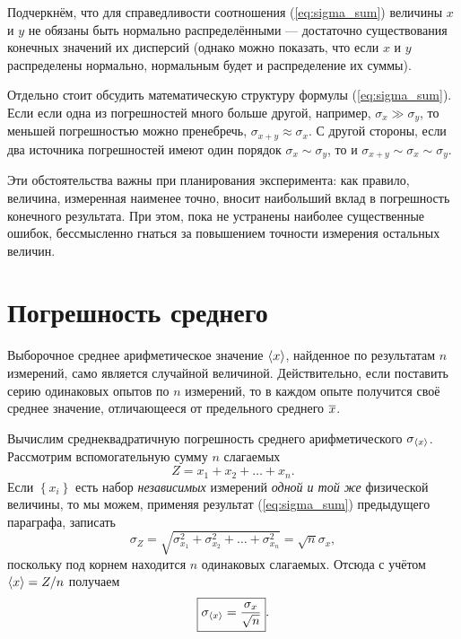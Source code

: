 Подчеркнём, что для справедливости соотношения (\ref{eq:sigma_sum})
величины $x$ и $y$ не обязаны быть нормально распределёнными ---
достаточно существования конечных значений их дисперсий (однако можно
показать, что если $x$ и $y$ распределены нормально, нормальным
будет и распределение их суммы).


Отдельно стоит обсудить математическую структуру формулы (\ref{eq:sigma_sum}).
Если если одна из погрешностей много больше другой, например,
$\sigma_{x}\gg\sigma_{y}$,
то меньшей погрешностью можно пренебречь, $\sigma_{x+y}\approx\sigma_{x}$.
С другой стороны, если два источника погрешностей имеют один порядок
$\sigma_{x}\sim\sigma_{y}$, то и $\sigma_{x+y}\sim\sigma_{x}\sim\sigma_{y}$.

Эти обстоятельства важны при планирования эксперимента: как правило,
величина, измеренная наименее точно, вносит наибольший вклад в погрешность
конечного результата. При этом, пока не устранены наиболее существенные
ошибок, бессмысленно гнаться за повышением точности измерения остальных
величин.


\section{Погрешность среднего}\label{sec:average}

Выборочное среднее арифметическое значение $\left<x\right>$, найденное
по результатам $n$ измерений, само является случайной величиной.
Действительно, если поставить серию одинаковых опытов по $n$ измерений,
то в каждом опыте получится своё среднее значение, отличающееся от
предельного среднего $\overline{x}$.

Вычислим среднеквадратичную погрешность среднего арифметического
$\sigma_{\left<x\right>}$.
Рассмотрим вспомогательную сумму $n$ слагаемых
\[
Z=x_{1}+x_{2}+\ldots+x_{n}.
\]
Если $\left\{ x_{i}\right\} $ есть набор \emph{независимых} измерений
\emph{одной и той же} физической величины, то мы можем, применяя результат
(\ref{eq:sigma_sum}) предыдущего параграфа, записать
\[
\sigma_{Z}=\sqrt{\sigma_{x_{1}}^{2}+\sigma_{x_{2}}^{2}+\ldots+\sigma_{x_{n}}^{2}
}=\sqrt{n}\sigma_{x},
\]
поскольку под корнем находится $n$ одинаковых слагаемых. Отсюда с
учётом $\left<x\right>=Z/n$ получаем
\begin{equation}
\boxed{{\sigma_{\left<x\right>}=\frac{\sigma_{x}}{\sqrt{n}}}}.\label{eq:sigma_avg}
\end{equation}

